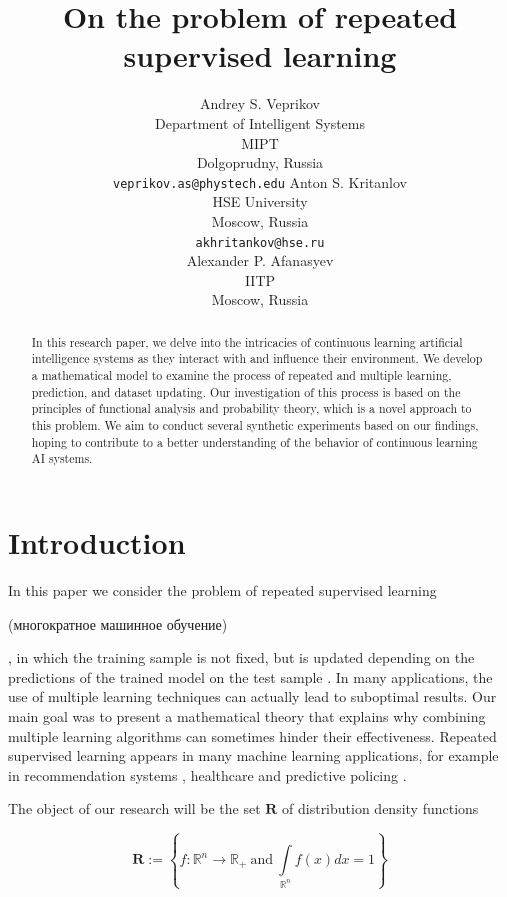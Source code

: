 \documentclass{article}
\title{On the problem of repeated supervised learning}
\author{
    Andrey S. Veprikov\\
	Department of Intelligent Systems\\
	MIPT\\
	Dolgoprudny, Russia \\
	\texttt{veprikov.as@phystech.edu} 
    \And
    Anton S. Kritanlov\\
    HSE University\\
    Moscow, Russia\\
    \texttt{akhritankov@hse.ru}\\
    \And
    Alexander P. Afanasyev \\
    IITP\\
    Moscow, Russia}
\date{}
\begin{document}
\maketitle

\begin{abstract}

    In this research paper, we delve into the intricacies of continuous learning artificial intelligence systems as they interact with and influence their environment. We develop a mathematical model to examine the process of repeated and multiple learning, prediction, and dataset updating. Our investigation of this process is based on the principles of functional analysis and probability theory, which is a novel approach to this problem. We aim to conduct several synthetic experiments based on our findings, hoping to contribute to a better understanding of the behavior of continuous learning AI systems.

\end{abstract}



\section{Introduction} \label{Introduction}

    In this paper we consider the problem of repeated supervised learning \begin{otherlanguage}{russian}(многократное машинное обучение)\end{otherlanguage}, in which the training sample is not fixed, but is updated depending on the predictions of the trained model on the test sample \cite{ma2020machine, khritankov2021existence, jiang2019degenerate}. In many applications, the use of multiple learning techniques can actually lead to suboptimal results. Our main goal was to present a mathematical theory that explains why combining multiple learning algorithms can sometimes hinder their effectiveness. Repeated supervised learning appears in many machine learning applications, for example in recommendation systems \cite{khritankov2021existence, sinha2016deconvolving}, healthcare \cite{adam2020hidden} and predictive policing \cite{ensign2018runaway}. 

    The object of our research will be the set $\mathbf{R}$ of distribution density functions

    \begin{equation}
        \label{R}
        \mathbf{R} := \left\{f : \mathbb{R}^n \rightarrow \mathbb{R}_+ ~\text{and}~ \int\limits_{\mathbb{R}^n}f(x)dx = 1\right\}
    \end{equation}
\end{document}
